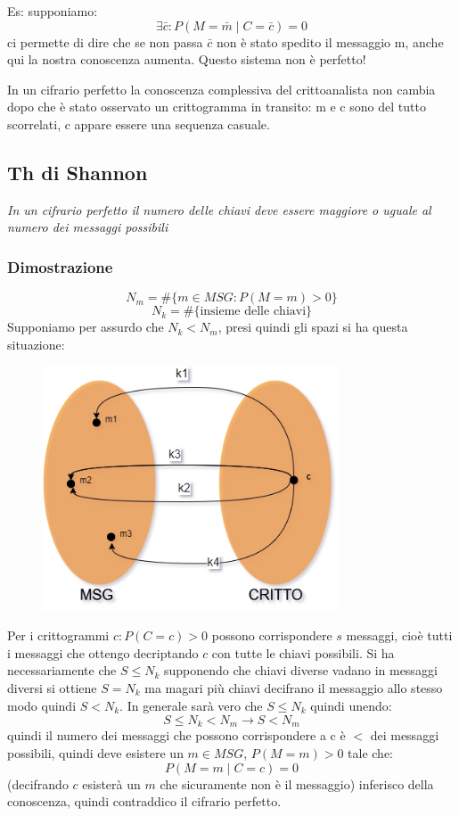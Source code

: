 Es: supponiamo:
$$\exists \bar{c} : P(M=\bar{m} \mid C=\bar{c}) = 0$$
ci permette di dire che se non passa $\bar{c}$ non è stato spedito il messaggio m, anche qui la nostra conoscenza aumenta. Questo sistema non è perfetto!

In un cifrario perfetto la conoscenza complessiva del crittoanalista non cambia dopo che è stato osservato un crittogramma in transito: m e c sono del tutto scorrelati, c appare essere una sequenza casuale.

\subsection{Th di Shannon}
\emph{In un cifrario perfetto il numero delle chiavi deve essere maggiore o uguale al numero dei messaggi possibili}
\subsubsection{Dimostrazione}
$$N_m = \#\{m \in MSG : P(M=m)>0\}$$
$$N_k = \#\{\text{insieme delle chiavi}\}$$
Supponiamo per assurdo che $N_k < N_m$, presi quindi gli spazi si ha questa situazione:

\begin{figure}[H]
  \centering
  \includegraphics[width = 250pt]{Shannon_proof.png}
\end{figure}

Per i crittogrammi $c : P(C=c) > 0$ possono corrispondere $s$ messaggi, cioè tutti i messaggi che ottengo decriptando $c$ con tutte le chiavi possibili. Si ha necessariamente che $S \leq N_k$ supponendo che chiavi diverse vadano in messaggi diversi si ottiene $S = N_k$ ma magari più chiavi decifrano il messaggio allo stesso modo quindi $S < N_k$. In generale sarà vero che $S \leq N_k$ quindi unendo:
$$ S \leq N_k < N_m \xrightarrow{} S < N_m $$
quindi il numero dei messaggi che possono corrispondere a c è $<$ dei messaggi possibili, quindi deve esistere un $m \in MSG$, $P(M=m) > 0$ tale che:
$$ P(M=m \mid C=c) = 0 $$
(decifrando $c$ esisterà un $m$ che sicuramente non è il messaggio) inferisco della conoscenza, quindi contraddico il cifrario perfetto.

